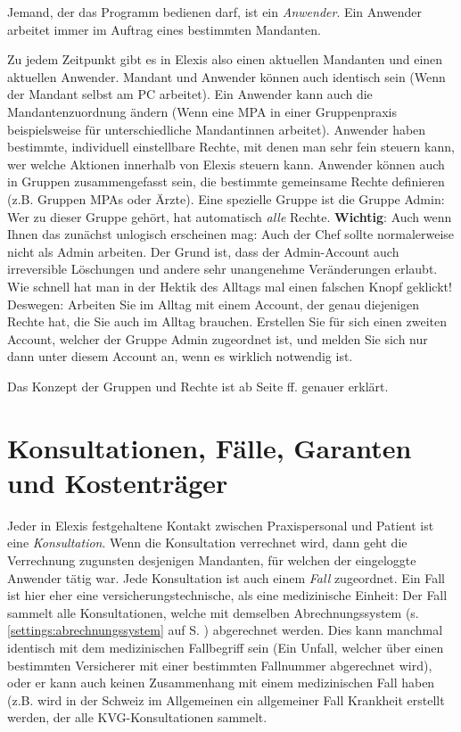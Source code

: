 \medskip

Jemand, der das Programm bedienen darf, ist ein \textit{Anwender}. Ein Anwender arbeitet immer im Auftrag eines bestimmten Mandanten.

Zu jedem Zeitpunkt gibt es in Elexis also einen aktuellen Mandanten und einen aktuellen Anwender.
Mandant und Anwender können auch identisch sein (Wenn der
Mandant selbst am PC arbeitet).
Ein Anwender kann auch die Mandantenzuordnung ändern (Wenn eine MPA in einer Gruppenpraxis beispielsweise für unterschiedliche
Mandantinnen arbeitet).
Anwender haben bestimmte, individuell einstellbare Rechte, mit denen man sehr
fein steuern kann, wer welche Aktionen innerhalb von Elexis steuern kann.
Anwender können auch in Gruppen zusammengefasst sein, die bestimmte gemeinsame
Rechte definieren (z.B. Gruppen \glqq MPAs\grqq{} oder \glqq Ärzte\grqq{}). Eine
spezielle Gruppe ist die Gruppe \glqq Admin\grqq{}: Wer zu dieser Gruppe gehört,
hat automatisch \textit{alle} Rechte.
\textbf{Wichtig}: Auch wenn Ihnen das zunächst unlogisch erscheinen mag: Auch
der Chef sollte normalerweise nicht als Admin  arbeiten.
Der Grund ist, dass der Admin-Account auch irreversible Löschungen und andere
sehr unangenehme Veränderungen erlaubt. Wie schnell hat man in der Hektik des
Alltags mal einen falschen Knopf geklickt!
Deswegen: Arbeiten Sie im Alltag mit einem Account, der genau diejenigen Rechte
hat, die Sie auch im Alltag brauchen. Erstellen Sie für sich einen zweiten
Account, welcher der Gruppe Admin zugeordnet ist, und melden Sie sich nur dann
unter diesem Account an, wenn es wirklich notwendig ist.

Das Konzept der Gruppen und Rechte ist ab Seite \pageref{sec:gruppen} ff.
genauer erklärt.

\section{Konsultationen, Fälle, Garanten und Kostenträger}
Jeder in Elexis festgehaltene Kontakt zwischen Praxispersonal und Patient ist eine \textit{Konsultation}. Wenn die Konsultation verrechnet wird, dann geht die Verrechnung zugunsten desjenigen Mandanten, für welchen der eingeloggte Anwender tätig war.
\label{definition:fall}
Jede Konsultation ist auch einem \textit{Fall} zugeordnet. Ein Fall ist hier eher eine versicherungstechnische, als eine medizinische Einheit: Der Fall sammelt alle Konsultationen, welche mit demselben Abrechnungssystem (s. \ref{settings:abrechnungssystem} auf S. \pageref{settings:abrechnungssystem}) abgerechnet werden. Dies kann manchmal identisch mit dem medizinischen Fallbegriff sein (Ein Unfall, welcher über einen bestimmten Versicherer mit einer bestimmten Fallnummer abgerechnet wird), oder er kann auch keinen Zusammenhang mit einem medizinischen Fall haben (z.B. wird in der Schweiz im Allgemeinen ein allgemeiner Fall \glqq Krankheit\grqq{} erstellt werden, der alle KVG-Konsultationen sammelt.

